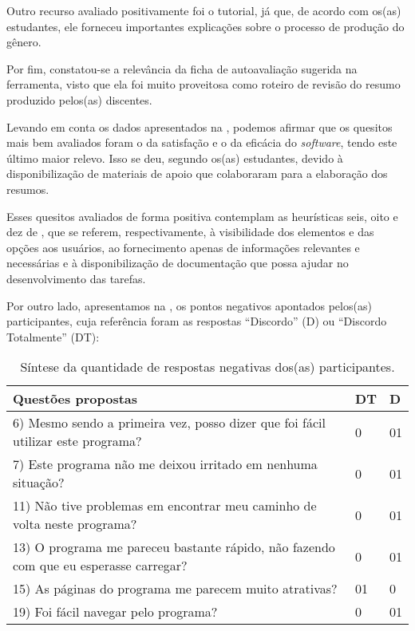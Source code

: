 \documentclass[portuguese]{textolivre}
\begin{document}
Outro recurso avaliado positivamente foi o tutorial, já que, de acordo com os(as) estudantes, ele forneceu importantes explicações sobre o processo de produção do gênero.

Por fim, constatou-se a relevância da ficha de autoavaliação sugerida na ferramenta, visto que ela foi muito proveitosa como roteiro de revisão do resumo produzido pelos(as) discentes.

Levando em conta os dados apresentados na , podemos afirmar que os quesitos mais bem avaliados foram o da satisfação e o da eficácia do \textit{software}, tendo este último maior relevo. Isso se deu, segundo os(as) estudantes, devido à disponibilização de materiais de apoio que colaboraram para a elaboração dos resumos.

Esses quesitos avaliados de forma positiva contemplam as heurísticas seis, oito e dez de \textcite{nielsen1994}, que se referem, respectivamente, à visibilidade dos elementos e das opções aos usuários, ao fornecimento apenas de informações relevantes e necessárias e à disponibilização de documentação que possa ajudar no desenvolvimento das tarefas.

Por outro lado, apresentamos na , os pontos negativos apontados pelos(as) participantes, cuja referência foram as respostas “Discordo” (D) ou “Discordo Totalmente” (DT):

\begin{table}[htbp]
\begin{threeparttable}
\caption{Síntese da quantidade de respostas negativas dos(as) participantes.}
\label{tbl3}
\centering
\begin{tabular}{p{10cm} ll}
\toprule
Questões propostas & DT & D \\ 
 \midrule
6) Mesmo sendo a primeira vez, posso dizer que foi fácil utilizar este programa? & 0 & 01 \\
7) Este programa não me deixou irritado em nenhuma situação? & 0 & 01 \\
11) Não tive problemas em encontrar meu caminho de volta neste programa? & 0 & 01 \\
13) O programa me pareceu bastante rápido, não fazendo com que eu esperasse carregar? & 
0 & 01 \\
15) As páginas do programa me parecem muito atrativas? & 01 & 0 \\
19) Foi fácil navegar pelo programa? & 0 & 01 \\
\bottomrule
\end{tabular}
\end{threeparttable}
\end{table}
\end{document}
